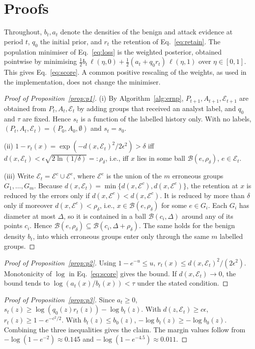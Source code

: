 \documentclass[preprint,12pt]{elsarticle}
\newcommand{\E}{\mathcal{E}}
\begin{document}
\appendix
\section{Proofs}\label{app:proofs}
Throughout, $b_t,a_t$ denote the densities of the benign and attack evidence at period $t$, $q_0$ the initial prior, and $r_t$ the retention of Eq.~\eqref{eq:retain}. The population minimiser of Eq.~\eqref{eq:loss} is the weighted posterior, obtained pointwise by minimising $\tfrac12 b_t\,\ell(\eta,0)+\tfrac12(a_t+q_0r_t)\,\ell(\eta,1)$ over $\eta\in[0,1]$. This gives Eq.~\eqref{eq:score}. A common positive rescaling of the weights, as used in the implementation, does not change the minimiser.

\begin{proof}[Proof of Proposition~\ref{prop:p1}]
(i) By Algorithm~\ref{alg:ernp}, $P_{t+1},A_{t+1},\E_{t+1}$ are obtained from $P_t,A_t,\E_t$ by adding groups that received an analyst label, and $q_0$ and $\tau$ are fixed. Hence $s_t$ is a function of the labelled history only. With no labels, $(P_t,A_t,\E_t)=(P_0,A_0,\emptyset)$ and $s_t=s_0$.

(ii) $1-r_t(x)=\exp(-d(x,\E_t)^2/2\epsilon^2)>\delta$ iff $d(x,\E_t)<\epsilon\sqrt{2\ln(1/\delta)}=:\rho_\delta$, i.e., iff $x$ lies in some ball $\mathcal B(e,\rho_\delta)$, $e\in\E_t$.

(iii) Write $\E_t=\E^{c}\cup\E^{e}$, where $\E^{e}$ is the union of the $m$ erroneous groups $G_1,\dots,G_m$. Because $d(x,\E_t)=\min\{d(x,\E^c),d(x,\E^e)\}$, the retention at $x$ is reduced by the errors only if $d(x,\E^e)<d(x,\E^c)$. It is reduced by more than $\delta$ only if moreover $d(x,\E^e)<\rho_\delta$, i.e., $x\in\mathcal B(e,\rho_\delta)$ for some $e\in G_i$. Each $G_i$ has diameter at most $\Delta$, so it is contained in a ball $\mathcal B(c_i,\Delta)$ around any of its points $c_i$. Hence $\mathcal B(e,\rho_\delta)\subseteq\mathcal B(c_i,\Delta+\rho_\delta)$. The same holds for the benign density $b_t$, into which erroneous groups enter only through the same $m$ labelled groups.
\end{proof}

\begin{proof}[Proof of Proposition~\ref{prop:p2}]
Using $1-e^{-u}\le u$, $r_t(x)\le d(x,\E_t)^2/(2\epsilon^2)$. Monotonicity of $\log$ in Eq.~\eqref{eq:score} gives the bound. If $d(x,\E_t)\to0$, the bound tends to $\log(a_t(x)/b_t(x))<\tau$ under the stated condition.
\end{proof}

\begin{proof}[Proof of Proposition~\ref{prop:p3}]
Since $a_t\ge0$, $s_t(z)\ge\log(q_0(z)r_t(z))-\log b_t(z)$. With $d(z,\E_t)\ge c\epsilon$, $r_t(z)\ge1-e^{-c^2/2}$. With $b_t(z)\le b_0(z)$, $-\log b_t(z)\ge-\log b_0(z)$. Combining the three inequalities gives the claim. The margin values follow from $-\log(1-e^{-2})\approx0.145$ and $-\log(1-e^{-4.5})\approx0.011$.
\end{proof}
\end{document}
